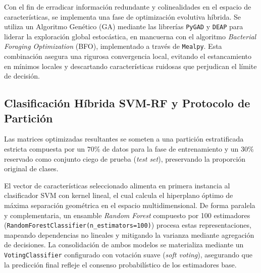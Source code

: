 Con el fin de erradicar información redundante y colinealidades en el espacio de características, se implementa una fase de optimización evolutiva híbrida. Se utiliza un Algoritmo Genético (GA) mediante las librerías \texttt{PyGAD} y \texttt{DEAP} para liderar la exploración global estocástica, en mancuerna con el algoritmo \textit{Bacterial Foraging Optimization} (BFO), implementado a través de \texttt{Mealpy}. Esta combinación asegura una rigurosa convergencia local, evitando el estancamiento en mínimos locales y descartando características ruidosas que perjudican el límite de decisión.

\subsection{Clasificación Híbrida SVM-RF y Protocolo de Partición}
Las matrices optimizadas resultantes se someten a una partición estratificada estricta compuesta por un $70\%$ de datos para la fase de entrenamiento y un $30\%$ reservado como conjunto ciego de prueba (\textit{test set}), preservando la proporción original de clases.

El vector de características seleccionado alimenta en primera instancia al clasificador SVM con kernel lineal, el cual calcula el hiperplano óptimo de máxima separación geométrica en el espacio multidimensional. De forma paralela y complementaria, un ensamble \textit{Random Forest} compuesto por 100 estimadores (\texttt{RandomForestClassifier(n\_estimators=100)}) procesa estas representaciones, mapeando dependencias no lineales y mitigando la varianza mediante agregación de decisiones. La consolidación de ambos modelos se materializa mediante un \texttt{VotingClassifier} configurado con votación suave (\textit{soft voting}), asegurando que la predicción final refleje el consenso probabilístico de los estimadores base.